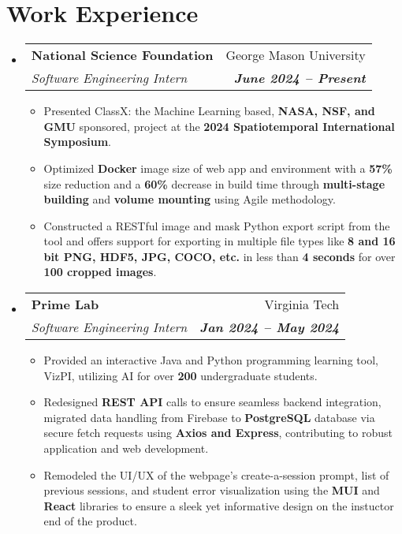 \documentclass[letterpaper, 10pt]{article}
\makeatletter
\newcommand{\resumeItem}[1]{
  \item\small{
    {#1 \vspace{-2pt}}
  }
}
\newcommand{\resumeSubheading}[4]{
  \vspace{-2pt}\item
    \begin{tabular*}{0.97\textwidth}[t]{l@{\extracolsep{\fill}}r}
      \textbf{#1} & #2 \\
      \textit{\small#3} & \textit{\textbf{\small #4}} \\
    \end{tabular*}\vspace{-7pt}
}
\newcommand{\resumeSubHeadingListStart}{\begin{itemize}[leftmargin=0.15in, label={}]}
\newcommand{\resumeSubHeadingListEnd}{\end{itemize}}
\newcommand{\resumeItemListStart}{\begin{itemize}}
\newcommand{\resumeItemListEnd}{\end{itemize}\vspace{-5pt}}
\makeatother
\begin{document}
\section{Work Experience}
    \vspace{3pt}
    \resumeSubHeadingListStart

	\resumeSubheading
		{National Science Foundation}{George Mason University}
		{Software Engineering Intern}{June 2024 \textbf{--} Present}
	\resumeItemListStart
		\resumeItem{Presented ClassX: the Machine Learning based, \textbf{NASA, NSF, and GMU} sponsored, project at the \textbf{2024 Spatiotemporal International Symposium}.}
		\resumeItem{Optimized \textbf{Docker} image size of web app and environment with a \textbf{57\%} size reduction and a \textbf{60\%} decrease in build time through \textbf{multi-stage building} and \textbf{volume mounting} using Agile methodology.} 
		\resumeItem{Constructed a RESTful image and mask Python export script from the tool and offers support for exporting in multiple file types like \textbf{8 and 16 bit PNG, HDF5, JPG, COCO, etc.} in less than \textbf{4 seconds} for over \textbf{100 cropped images}.}
	 \resumeItemListEnd
	
	\resumeSubheading
		{Prime Lab}{Virginia Tech}
		{Software Engineering Intern}{Jan 2024 \textbf{--} May 2024}

	  \resumeItemListStart
		\resumeItem{Provided an interactive Java and Python programming learning tool, VizPI, utilizing AI for over \textbf{200} undergraduate students.}
		\resumeItem{Redesigned \textbf{REST API} calls to ensure seamless backend integration, migrated data handling from Firebase to \textbf{PostgreSQL} database via secure fetch requests using \textbf{Axios and Express}, contributing to robust application and web development.}
		\resumeItem{Remodeled the UI/UX of the webpage's create-a-session prompt, list of previous sessions, and student error visualization using the \textbf{MUI} and \textbf{React} libraries to ensure a sleek yet informative design on the instuctor end of the product.}
	 \resumeItemListEnd
	
\resumeSubHeadingListEnd
\end{document}
